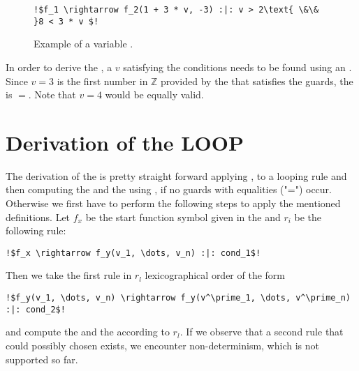 \newsavebox{\stemextwo}%
\newsavebox{\stemextwosecond}%
\begin{figure}[H]
	\begin{lstlisting}[escapechar=!]
	!$f_1 \rightarrow f_2(1 + 3 * v, -3) :|: v > 2\text{ \&\& }8 < 3 * v $!
	\end{lstlisting}	
	\caption{Example of a variable \stem.}
	\label{lst:stem-var}
\end{figure}
In order to derive the \stem, a $v$ satisfying the conditions needs to be found using an \solver. Since $v=3$ is the first number in $\mathbb{Z}$ provided by the \solver that satisfies the guards, the \stem is \usebox{\stemextwo}$=$\usebox{\stemextwosecond}. Note that $v=4$ would be equally valid.

\section{Derivation of the LOOP}
\label{sec:loop}
The derivation of the \loopt is pretty straight forward applying ,  to a looping rule and then computing the \iterationmatrix and the \iterationconstants using , if no guards with equalities ("=") occur. Otherwise we first have to perform the following steps to apply the mentioned definitions. \newline
Let $f_x$ be the start function symbol given in the \its and $r_i$ be the following rule:
\begin{lstlisting}[escapechar=!]
	!$f_x \rightarrow f_y(v_1, \dots, v_n) :|: cond_1$!
\end{lstlisting} 
Then we take the first rule in $r_l$ lexicographical order of the form 
\begin{lstlisting}[escapechar=!]
	!$f_y(v_1, \dots, v_n) \rightarrow f_y(v^\prime_1, \dots, v^\prime_n) :|: cond_2$!
\end{lstlisting}
and compute the \iterationmatrix and the \iterationconstants according to $r_l$. 
If we observe that a second rule that could possibly chosen exists, we encounter non-determinism, which is not supported so far.

